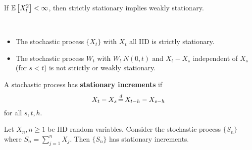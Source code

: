 \documentclass[a4 paper]{article}
\begin{document}
\begin{lem}
    If $\mathbb{E}\left[X_t^2\right] < \infty$, then strictly stationary implies weakly stationary.
\end{lem}

\begin{example}{\ }
    \begin{itemize}
        \item The stochastic process $\{ X_t \}$ with $X_t$ all IID is strictly stationary.
        \item The stochastic process $W_t$ with $W_t ~ N(0,t)$ and $X_t - X_s$ independent of $X_s$ (for $s < t$) is not strictly or weakly stationary.
    \end{itemize}
\end{example}
\begin{defn}
    A stochastic process has \textbf{stationary increments} if 
    \[
        X_t - X_s \eqd X_{t-h} - X_{s-h}
    \] for all $s, t, h$.
\end{defn}

\begin{example}
    Let $X_n, n \geq 1$ be IID random variables.  Consider the stochastic process $\{ S_n \}$ where $S_n = \sum^n_{j=1} X_j$.  Then $\{ S_n \}$ has stationary increments.
\end{example}
\end{document}
